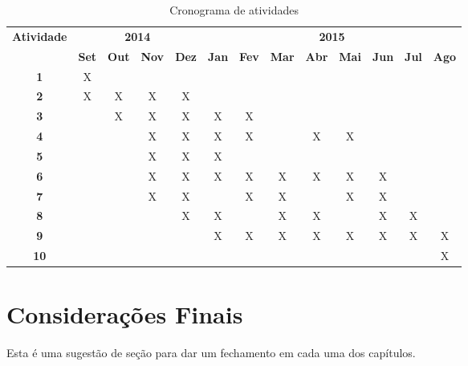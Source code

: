 \begin{table}[h!]
\renewcommand{\arraystretch}{1.3}
\caption{Cronograma de atividades}
\label{tab:cronograma}
\begin{tabular}{|c|c|c|c|c|c|c|c|c|c|c|c|c|}
\hline
\multirow{2}{*}{\textbf{\textbf{Atividade}}} & \multicolumn{4}{c|}{\textbf{2014}}& \multicolumn{8}{c|}{\textbf{2015}} \\ \cline{2-13} 
& \multicolumn{1}{l|}{\textbf{Set}} & \multicolumn{1}{l|}{\textbf{Out}} & \multicolumn{1}{l|}{\textbf{Nov}} & \multicolumn{1}{l|}{\textbf{Dez}} & \multicolumn{1}{l|}{\textbf{Jan}} & \multicolumn{1}{l|}{\textbf{Fev}} & \multicolumn{1}{l|}{\textbf{Mar}} & \multicolumn{1}{l|}{\textbf{Abr}} & \multicolumn{1}{l|}{\textbf{Mai}} & \multicolumn{1}{l|}{\textbf{Jun}} & \multicolumn{1}{l|}{\textbf{Jul}} & \multicolumn{1}{l|}{\textbf{Ago}} \\ \hline
\textbf{1}  & X &   &   &   &   &   &   &   &   &   &   &  \\ \hline
\textbf{2}  & X & X & X & X &   &   &   &   &   &   &   &  \\ \hline
\textbf{3}  &   & X & X & X & X & X &   &   &   &   &   &  \\ \hline
\textbf{4}  &   &   & X & X & X & X &   & X & X &   &   &  \\ \hline
\textbf{5}  &   &   & X & X & X &   &   &   &   &   &   &  \\ \hline
\textbf{6}  &   &   & X & X & X & X & X & X & X & X &   &  \\ \hline
\textbf{7}  &   &   & X & X &   & X & X &   & X & X &   &  \\ \hline
\textbf{8}  &   &   &   & X & X &   & X & X &   & X & X &  \\ \hline
\textbf{9}  &   &   &   &   & X & X & X & X & X & X & X & X \\ \hline
\textbf{10} &   &   &   &   &   &   &   &   &   &   &   & X \\ \hline
\end{tabular}
\end{table}

\section{Considerações Finais}
\label{cap:proposta:consideracoes:finais}

Esta é uma sugestão de seção para dar um fechamento em cada uma dos capítulos.